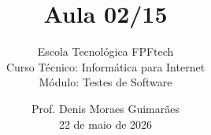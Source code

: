 
\title{Aula 02/15}

\subtitle{
\vspace{1.0cm}
Escola Tecnológica FPFtech\\
\vspace{0.5cm}
Curso Técnico: Informática para Internet\\
\vspace{0.5cm}
Módulo: Testes de Software
\vspace{1.0cm}
}

\author{
Prof. Denis Moraes Guimarães\\
\small 22 de maio de 2026
}

\date{}